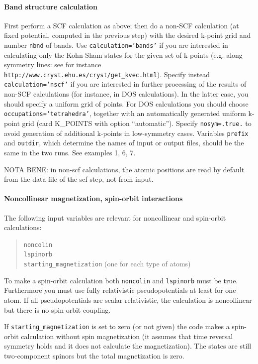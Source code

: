 \documentclass[12pt,a4paper]{article}
\begin{document}
\paragraph{Band structure calculation}
First perform a SCF calculation as above;
then do a non-SCF calculation (at fixed potential, computed in the
previous step) with the desired k-point grid and  number \texttt{nbnd}
of bands. 
Use \texttt{calculation='bands'} if you are interested in calculating
only the Kohn-Sham states for the given set of k-points
(e.g. along symmetry lines: see for instance
\texttt{http://www.cryst.ehu.es/cryst/get\_kvec.html}). Specify instead
\texttt{calculation='nscf'} if you are interested in further processing 
of the results of non-SCF calculations (for instance, in DOS calculations).
In the latter case, you should specify a uniform grid of points.
For DOS calculations you should choose \texttt{occupations='tetrahedra'}, 
together with an automatically generated uniform k-point grid 
(card K\_POINTS with option ``automatic'').
Specify \texttt{nosym=.true.} to avoid generation of additional k-points in
low-symmetry cases. Variables \texttt{prefix} and \texttt{outdir}, which
determine
the names of input or output files, should be the same in the two runs.
See examples 1, 6, 7.

NOTA BENE: in non-scf calculations, the atomic positions are read by
default from the data file of the scf step, not from input.

\paragraph{Noncollinear magnetization, spin-orbit interactions}

The following input variables are relevant for noncollinear and
spin-orbit calculations: 
\begin{quote}
      \texttt{noncolin}\\
      \texttt{lspinorb}\\
      \texttt{starting\_magnetization} (one for each type of atoms)
\end{quote}
To make a spin-orbit calculation both \texttt{noncolin} and
\texttt{lspinorb} must be true. Furthermore you must use fully
relativistic pseudopotentials at least for one atom. If all
pseudopotentials are scalar-relativistic, the calculation is
noncollinear but there is no spin-orbit coupling.

If \texttt{starting\_magnetization} is set to zero (or not given) 
the code makes a spin-orbit calculation without spin magnetization 
(it assumes that time reversal symmetry holds and it does not calculate 
the magnetization). The states are still two-component spinors but the
total magnetization is zero. 
\end{document}
